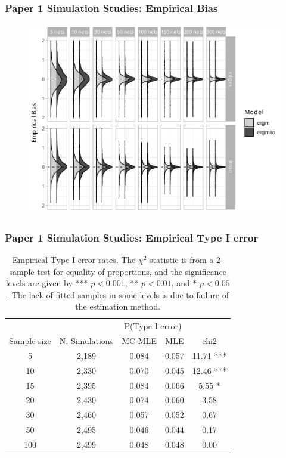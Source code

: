 \documentclass[aspectratio=169, 10pt]{beamer}\usepackage[]{graphicx}\usepackage[]{color}
\begin{document}
\begin{frame}
\frametitle{Paper 1 Simulation Studies: Empirical Bias}

\begin{figure}
\centering
\includegraphics[width=.6\linewidth]{bias-02-various-sizes-4-5-ttriad.pdf}
\end{figure}

\end{frame}

\begin{frame}
\frametitle{Paper 1 Simulation Studies: Empirical Type I error}

\footnotesize

\begin{table}[ht]
	\centering
	\begin{tabular}{ccccc}
		\toprule & & \multicolumn{2}{c}{P(Type I error)} \\ \cmidrule(r){3-4}
		Sample size & N. Simulations & MC-MLE & MLE & chi2 \\ 
		\midrule
		5 & 2,189 & 0.084 & 0.057 & 11.71 *** \\ 
		10 & 2,330 & 0.070 & 0.045 & 12.46 *** \\ 
		15 & 2,395 & 0.084 & 0.066 & 5.55 * \\ 
		20 & 2,430 & 0.074 & 0.060 & 3.58  \\ 
		30 & 2,460 & 0.057 & 0.052 & 0.67  \\ 
		50 & 2,495 & 0.046 & 0.044 & 0.17  \\ 
		100 & 2,499 & 0.048 & 0.048 & 0.00  \\ 
		\bottomrule
	\end{tabular}
	\caption{\label{tab:typeI}Empirical Type I error rates. The $\chi^2$ statistic is from a 2-sample test for equality of proportions, and the significance levels are given by *** $p < 0.001$, ** $p < 0.01$, and * $p < 0.05$. The lack of fitted samples in some levels is due to failure of the estimation method.} 
\end{table}

\end{frame}
\end{document}
